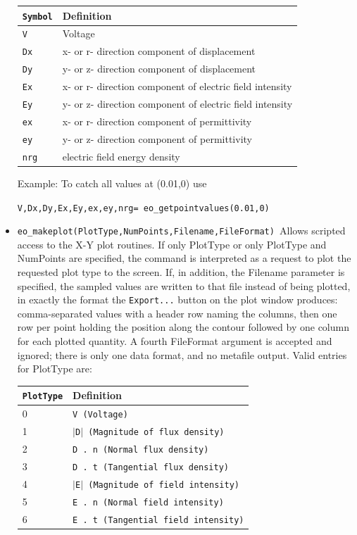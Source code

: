 \begin{itemize}
\begin{tabular}{ll}
\texttt{Symbol} &  Definition \\ \hline
\texttt{V} & Voltage \\
\texttt{Dx} & x- or r- direction component of displacement \\
\texttt{Dy} & y- or z- direction component of displacement \\
\texttt{Ex} & x- or r- direction component of electric field intensity \\
\texttt{Ey} & y- or z- direction component of electric field intensity \\
\texttt{ex} & x- or r- direction component of permittivity \\
\texttt{ey} & y- or z- direction component of permittivity \\
\texttt{nrg} & electric field energy density \\
\end{tabular}

Example: To catch all values at (0.01,0) use

\texttt{V,Dx,Dy,Ex,Ey,ex,ey,nrg= eo\_getpointvalues(0.01,0) }

\item \texttt{eo\_makeplot(PlotType,NumPoints,Filename,FileFormat) }Allows scripted access
to the X-Y plot routines. If only PlotType or only PlotType and NumPoints
are specified, the command is interpreted as a request to plot the requested
plot type to the screen. If, in addition, the Filename parameter is
specified, the sampled values are written to that file instead of being
plotted, in exactly the format the \texttt{Export...} button on the plot
window produces: comma-separated values with a header row naming the columns,
then one row per point holding the position along the contour followed by one
column for each plotted quantity. A fourth FileFormat argument is accepted and
ignored; there is only one data format, and no metafile output. Valid entries
for PlotType are:

\begin{tabular}{ll}
\texttt{PlotType} &  Definition \\ \hline
 0 & \texttt{V (Voltage)} \\
 1 & \texttt{$\vert$D$\vert$ (Magnitude of flux density)} \\
 2 & \texttt{D . n (Normal flux density)} \\
 3 & \texttt{D . t (Tangential flux density)} \\
 4 & \texttt{$\vert$E$\vert$ (Magnitude of field intensity)} \\
 5 & \texttt{E . n (Normal field intensity)} \\
 6 & \texttt{E . t (Tangential field intensity)}
\end{tabular}



\end{itemize}
